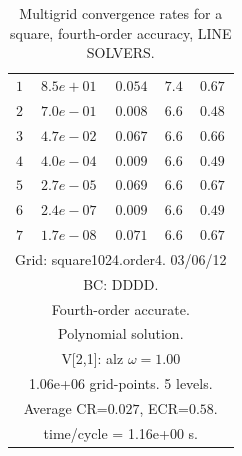 \begin{table}[hbt]
\begin{center}
{\begin{tabular}{|c|c|c|c|c|}
 $ 1$  & $ 8.5e+01$ & $0.054$ & $ 7.4$ & $0.67$ \\ 
 $ 2$  & $ 7.0e-01$ & $0.008$ & $ 6.6$ & $0.48$ \\ 
 $ 3$  & $ 4.7e-02$ & $0.067$ & $ 6.6$ & $0.66$ \\ 
 $ 4$  & $ 4.0e-04$ & $0.009$ & $ 6.6$ & $0.49$ \\ 
 $ 5$  & $ 2.7e-05$ & $0.069$ & $ 6.6$ & $0.67$ \\ 
 $ 6$  & $ 2.4e-07$ & $0.009$ & $ 6.6$ & $0.49$ \\ 
 $ 7$  & $ 1.7e-08$ & $0.071$ & $ 6.6$ & $0.67$ \\ 
\hline 
\multicolumn{5}{|c|}{Grid: square1024.order4. 03/06/12}  \\
\multicolumn{5}{|c|}{BC: DDDD.}  \\
\multicolumn{5}{|c|}{Fourth-order accurate.}  \\
\multicolumn{5}{|c|}{Polynomial solution.}  \\
\multicolumn{5}{|c|}{V[2,1]: alz $\omega=1.00$}  \\
\multicolumn{5}{|c|}{1.06e+06 grid-points. 5 levels.}  \\
\multicolumn{5}{|c|}{Average CR=$0.027$, ECR=$0.58$.}  \\
\multicolumn{5}{|c|}{time/cycle = 1.16e+00 s.}  \\
\hline 
\end{tabular}

\qquad %
}%
\end{center}
\caption{Multigrid convergence rates for a square, fourth-order accuracy, LINE SOLVERS.}
 \label{tab:square4} 
\end{table}








